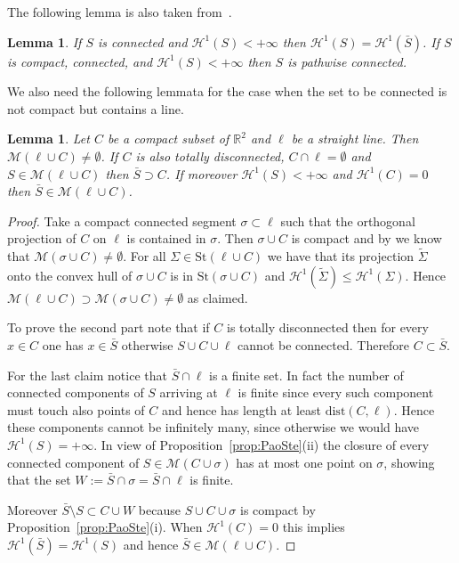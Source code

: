 \documentclass{amsart}
\newcommand{\RR}{\mathbb R}
\renewcommand{\H}{\mathcal H}
\newcommand{\St}{\mathrm{St}}
\newcommand{\M}{\mathcal{M}}
\renewcommand{\H}{\mathcal{H}}
\newcommand{\dist}{\mathrm{dist}}
\newtheorem{lemma}[theorem]{Lemma}
\theoremstyle{definition}
\theoremstyle{remark}
\begin{document}
The following lemma is also taken from~\cite[Proposition~2.2 and lemma~2.6]{PaoSte12}.

\begin{lemma}\label{lm:connected}
If $S$ is connected and $\H^1(S)<+\infty$ then $\H^1(S) = \H^1(\bar S)$.
If $S$ is compact, connected, and $\H^1(S)<+\infty$ then $S$ is 
pathwise connected.
\end{lemma}

We also need the following lemmata for the case when the set to 
be connected is not compact but contains a line.

\begin{lemma}\label{lm:exists}
  Let $C$ be a compact subset of $\RR^2$ and $\ell$ be a straight line.
  Then $\M(\ell\cup C)\neq \emptyset$.
  If $C$ is also totally disconnected, $C\cap \ell=\emptyset$ 
  and $S\in \M(\ell\cup C)$  
  then $\bar S \supset C$.
  If moreover $\H^1(S)<+\infty$ and $\H^1(C)=0$ 
  then $\bar S\in \M(\ell\cup C)$.
\end{lemma}
\begin{proof}
  Take a compact connected segment $\sigma\subset \ell$ such that 
  the orthogonal projection of $C$ on $\ell$ is contained 
  in $\sigma$. 
  Then $\sigma\cup C$ is compact and by 
  \cite{PaoSte12} we know that 
  $\M(\sigma \cup C)\neq \emptyset$.
  For all $\Sigma \in \St(\ell\cup C)$ we have that its projection 
  $\tilde \Sigma$ 
  onto the convex hull of $\sigma\cup C$ is in $\St(\sigma\cup C)$
  and $\H^1(\tilde \Sigma)\le \H^1(\Sigma)$.
  Hence $\M(\ell\cup C)\supset \M(\sigma\cup C)\neq \emptyset$ as claimed.

  To prove the second part note that if $C$ is totally disconnected 
  then for every $x\in C$ one has $x\in \bar S$ otherwise 
  $S\cup C\cup \ell$ cannot be connected. 
  Therefore $C\subset \bar S$. 
  
  For the last claim notice that $\bar S\cap \ell$ is a finite set.
  In fact the number of connected components of $S$ arriving at $\ell$ 
  is finite since every such component must touch also points of $C$ 
  and hence has length at least $\dist(C,\ell)$.  
  Hence these components cannot be infinitely many,
  since otherwise we would have $\H^1(S)=+\infty$.
  In view of Proposition~\ref{prop:PaoSte}(ii) 
  the closure of every connected component 
  of $S\in\M(C\cup \sigma)$ 
  has at most one point on $\sigma$, showing that the set 
  $W:=\bar S\cap \sigma = \bar S \cap \ell$ 
  is finite.

  Moreover $\bar S \setminus S \subset C\cup W$ because 
  $S\cup C\cup \sigma$ is compact by Proposition~\ref{prop:PaoSte}(i).
  When $\H^1(C)=0$ this implies $\H^1(\bar S)=\H^1(S)$ and hence 
  $\bar S\in \M(\ell\cup C)$.
\end{proof}
\end{document}
